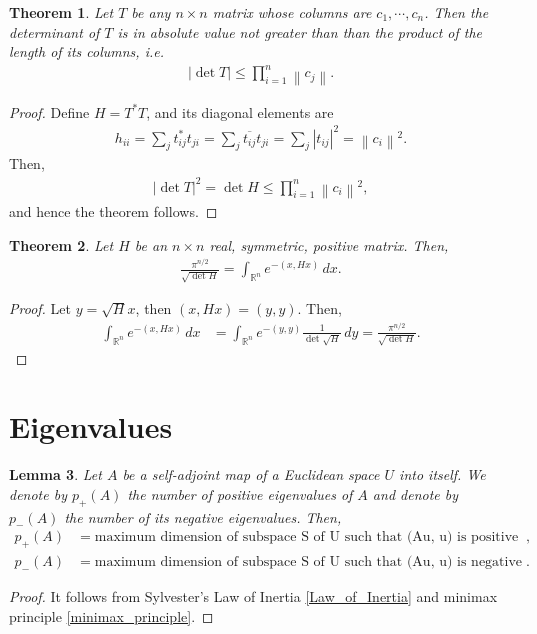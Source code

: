 \documentclass[11pt]{book}
\newtheorem{theorem}{Theorem}[section]
\newtheorem{lemma}[theorem]{Lemma}
\theoremstyle{definition}
\numberwithin{equation}{chapter}
\begin{document}
\medskip

\begin{theorem}
Let $T$ be any $n \times n$ matrix whose columns are $c_1, \cdots, c_n$. Then the determinant of $T$ is in absolute value not greater than than the product of the length of its columns, i.e.
\begin{align*}
    \left|\det T \right| \leq \prod^n_{i=1} \left\|c_j \right\|.
\end{align*}
\end{theorem}
\begin{proof}
Define $H = T^*T$, and its diagonal elements are
\begin{align*}
    h_{ii} = \sum_j t^*_{ij}t_{ji} = \sum_j \overline{t_{ij}} t_{ji} = \sum_j \left|t_{ij}\right|^2 = \left\|c_i \right\|^2.
\end{align*}
Then,
\begin{align*}
    \left|\det T \right|^2 = \det H \leq \prod^n_{i=1} \left\|c_i \right\|^2,
\end{align*}
and hence the theorem follows.
\end{proof}

\medskip

\begin{theorem}
Let $H$ be an $n \times n$ real, symmetric, positive matrix. Then,
\begin{align*}
    \frac{\pi^{n/2}}{\sqrt{\det H}} = \int_{\mathbb{R}^n} e^{-(x,Hx)}\, dx.
\end{align*}
\end{theorem}
\begin{proof}
Let $y = \sqrt{H}x$, then $(x, Hx) = (y, y)$. Then,
\begin{align*}
    \int_{\mathbb{R}^n} e^{-(x,Hx)}\, dx & = \int_{\mathbb{R}^n} e^{-(y,y)} \frac{1}{\det \sqrt{H}} \, dy = \frac{\pi^{n/2}}{\sqrt{\det H}}.
\end{align*}
\end{proof}

\section{Eigenvalues}
\begin{lemma}
Let $A$ be a self-adjoint map of a Euclidean space $U$ into itself. We denote by $p_+(A)$ the number of positive eigenvalues of $A$ and denote by $p_-(A)$ the number of its negative eigenvalues. Then, 
\begin{align*}
    p_+(A) & = \text{maximum dimension of subspace S of U such that (Au, u) is positive on S}, \\
    p_-(A) & = \text{maximum dimension of subspace S of U such that (Au, u) is negative on S}.
\end{align*}
\end{lemma}
\begin{proof}
It follows from Sylvester’s Law of Inertia \ref{Law_of_Inertia} and minimax principle \ref{minimax_principle}.
\end{proof}
\end{document}
